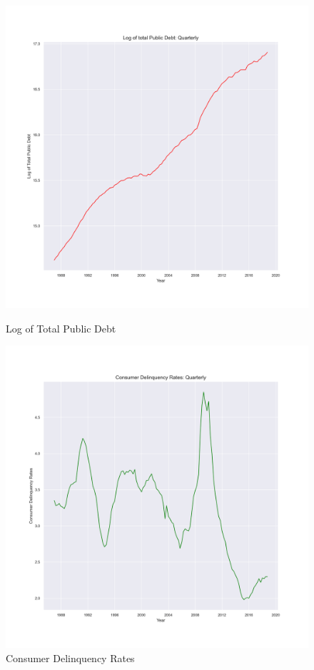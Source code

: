 \documentclass[11pt, oneside]{article}   	%
\begin{document}
\begin{figure}[h]
\centering
\begin{minipage}{.5\textwidth}
  \centering
  \includegraphics[width=.8\linewidth]{lndebt_graph}
  \caption{Log of Total Public Debt}
  \label{fig:test1}
\end{minipage}%
\begin{minipage}{.5\textwidth}
  \centering
  \includegraphics[width=.8\linewidth]{rates_graph}
  \caption{Consumer Delinquency Rates}
  \label{fig:test2}
\end{minipage}
\end{figure}
\end{document}
